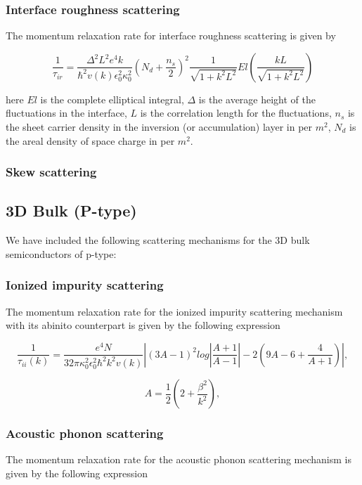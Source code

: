 \documentclass[12pt]{article}
\begin{document}
\subsubsection{Interface roughness scattering}
The momentum relaxation rate for interface roughness scattering is given by \cite{goodnick1985surface, ferry2016semiconductor}

\begin{equation}
    \frac{1}{\tau_{ir}} = \frac{\Delta^2 L^2  e^4 k}{\hbar^2 v(k) \epsilon_0^2 \kappa_0^2} \left( N_{d} + \frac{n_s}{2} \right)^2 \frac{1}{\sqrt{1+k^2L^2}} El(\frac{kL}{\sqrt{1+k^2L^2}})
    \label{ir}
\end{equation}

here $El$ is the complete elliptical integral, $\Delta$ is the average height of the fluctuations in the interface, $L$ is the correlation length for the fluctuations, $n_s$ is the sheet carrier density in the inversion (or accumulation) layer in per $m^2$, $N_{d}$ is the areal density of space charge in per $m^2$.
\subsubsection{Skew scattering}


\subsection{3D Bulk (P-type)}
We have included the following scattering mechanisms for the 3D bulk semiconductors of p-type: 

\subsubsection{Ionized impurity scattering}
The momentum relaxation rate for the ionized impurity scattering mechanism with its abinito counterpart is given by the following expression \cite{ramu2011thermoelectric}

\begin{equation}
\frac{1}{\tau_{ii}(k)} = \frac{e^4 N }{32\pi \kappa_0^2 \epsilon_0^2\hbar^2 k^2 v(k)} \left|  (3A-1)^2 log \left|  \frac{A+1}{A-1} \right|  -2 (9A-6+ \frac{4}{A+1}) \right|  ,
\label{Ionized_impurity_p}
\end{equation}

\begin{equation}
A = \frac{1}{2} \left(2 + \frac{\beta^2}{k^2}\right),
\label{A}
\end{equation}

\subsubsection{Acoustic phonon scattering}
The momentum relaxation rate for the acoustic phonon scattering mechanism is given by the following expression \cite{ramu2011thermoelectric}
\end{document}
